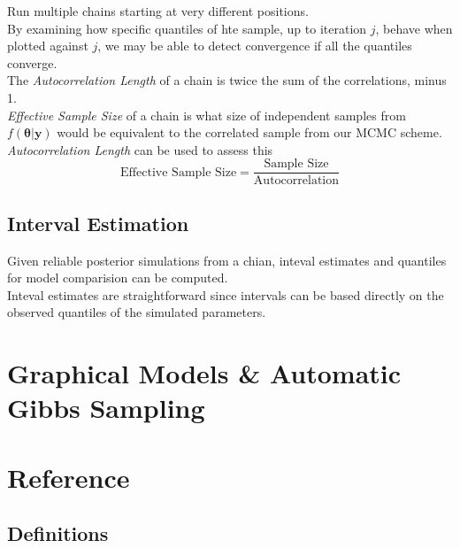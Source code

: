 \documentclass[11pt,a4paper]{article}
\begin{document}
Run multiple chains starting at very different positions.\\

By examining how specific quantiles of hte sample, up to iteration $j$, behave when plotted against $j$, we may be able to detect convergence if all the quantiles converge.\\

The \textit{Autocorrelation Length} of a chain is twice the sum of the correlations, minus 1.\\

\textit{Effective Sample Size} of a chain is what size of independent samples from $f(\pmb\theta|\textbf{y})$ would be equivalent to the correlated sample from our MCMC scheme.\\
\textit{Autocorrelation Length} can be used to assess this
$$\text{Effective Sample Size}=\frac{\text{Sample Size}}{\text{Autocorrelation}}$$

\subsection{Interval Estimation}

\proposition{}
Given reliable posterior simulations from a chian, inteval estimates and quantiles for model comparision can be computed.\\
Inteval estimates are straightforward since intervals can be based directly on the observed quantiles of the simulated parameters.

\section{Graphical Models \& Automatic Gibbs Sampling}

\newpage
\setcounter{section}{-1}
\section{Reference}

\subsection{Definitions}



\end{document}
